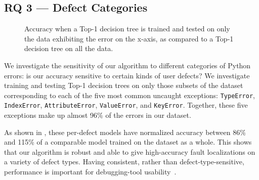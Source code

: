 \documentclass[conference]{IEEEtran}
\newcommand\lt[1]{{\lstinline|#1|}}
\begin{document}





\subsection{RQ 3 --- Defect Categories}

\begin{figure}
\caption{Accuracy when a Top-1 decision tree is trained and tested on only the data exhibiting
the error on the x-axis, as compared to a Top-1 decision tree on all the data.
}
\label{fig-defect-categories}
\end{figure}

We investigate the sensitivity of our algorithm to different categories of
Python errors: is our accuracy sensitive to certain kinds of user defects?
We investigate training and testing Top-1 decision trees on only those
subsets of the dataset corresponding to each of the five most common
uncaught exceptions: \lt{TypeError}, \lt{IndexError}, \lt{AttributeError},
\lt{ValueError}, and \lt{KeyError}. Together, these five exceptions make
up almost 96\% of the errors in our dataset.

As shown in , these per-defect models have
normalized accuracy between 86\% and 115\% of a comparable model trained on
the dataset as a whole. This shows that our algorithm is robust and able to
give high-accuracy fault localizations on a variety of defect types.
Having consistent, rather than defect-type-sensitive, performance is
important for debugging-tool
usability~\cite{orso-parnin,Bessey2010,ayewah10}.
\end{document}
